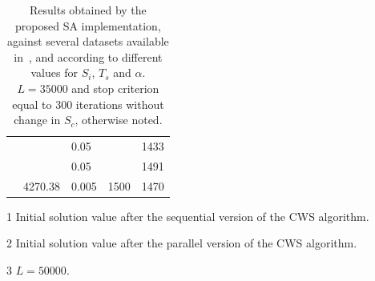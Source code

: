 \begin{table}[h!]
\begin{threeparttable}
\begin{tabularx}{0.45\textwidth}{ X X X X X }
                                        &                           & 0.05  &                       & 1433  \\ [0.5ex]
                                        &                           & 0.05  &                       & 1491\tnote{3}  \\ [0.5ex] %
            \cmidrule{2-5}
                                        & 4270.38                   & 0.005 & 1500\tnote{2}                  & 1470  \\ [0.5ex]
            \bottomrule
        \end{tabularx}
        \begin{tablenotes}
            \footnotesize
            \item[1]Initial solution value after the sequential version of the CWS algorithm.
            \item[2]Initial solution value after the parallel version of the CWS algorithm.
            \item[3]$L = 50000$.
        \end{tablenotes}
    \caption{Results obtained by the proposed SA implementation, against 
            several datasets available in~\cite{website:cvrp-datasets}, and 
            according to different values for $S_i$, $T_s$ and $\alpha$. 
            $L = 35000$ and stop criterion equal to 300 iterations without 
            change in $S_c$, otherwise noted.}
    \label{tab:sa-results-1}
    \end{threeparttable}
\end{table}

